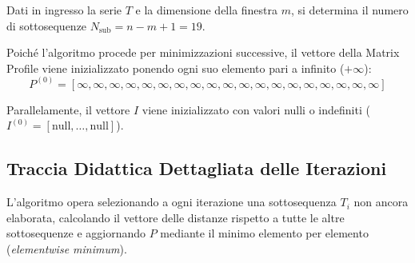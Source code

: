 Dati in ingresso la serie $T$ e la dimensione della finestra $m$, si determina il numero di sottosequenze $N_{\text{sub}} = n - m + 1 = 19$. 

Poich\'e l'algoritmo procede per minimizzazioni successive, il vettore della Matrix Profile viene inizializzato ponendo ogni suo elemento pari a infinito ($+\infty$):
\begin{equation}
\label{eq:p-init}
P^{(0)} = [\infty, \infty, \infty, \infty, \infty, \infty, \infty, \infty, \infty, \infty, \infty, \infty, \infty, \infty, \infty, \infty, \infty, \infty, \infty]
\end{equation}

Parallelamente, il vettore $I$ viene inizializzato con valori nulli o indefiniti ($I^{(0)} = [\text{null}, \dots, \text{null}]$).

\FloatBarrier
\subsection{Traccia Didattica Dettagliata delle Iterazioni}
\label{subsec:ts-toy-example-trace}

L'algoritmo opera selezionando a ogni iterazione una sottosequenza $T_i$ non ancora elaborata, calcolando il vettore delle distanze rispetto a tutte le altre sottosequenze e aggiornando $P$ mediante il minimo elemento per elemento (\textit{elementwise minimum}).

